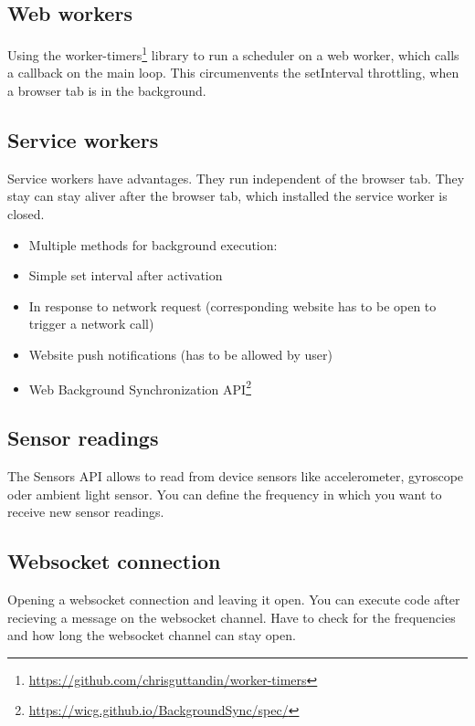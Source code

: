 \documentclass[article,type=bsc,colorback,accentcolor=tud9c]{tudthesis}
\begin{document}
  \subsection{Web workers}
  
  Using the worker-timers\footnote{\url{https://github.com/chrisguttandin/worker-timers}} library to run a scheduler on a web worker, which calls a callback on the main loop. This circumenvents the setInterval throttling, when a browser tab is in the background.

  \subsection{Service workers}

  Service workers have advantages. They run independent of the browser tab. They stay can stay aliver after the browser tab, which installed the service worker is closed.

  \begin{itemize}   
  \item Multiple methods for background execution:

  \item Simple set interval after activation

  \item In response to network request (corresponding website has to be open to trigger a network call)

  \item Website push notifications (has to be allowed by user)

  \item Web Background Synchronization API\footnote{\url{https://wicg.github.io/BackgroundSync/spec/}}
  \end{itemize}
  
  \subsection{Sensor readings}
  
  The Sensors API allows to read from device sensors like accelerometer, gyroscope oder ambient light sensor. You can define the frequency in which you want to receive new sensor readings.

  \subsection{Websocket connection}

  Opening a websocket connection and leaving it open. You can execute code after recieving a message on the websocket channel. Have to check for the frequencies and how long the websocket channel can stay open.
  
\end{document}
